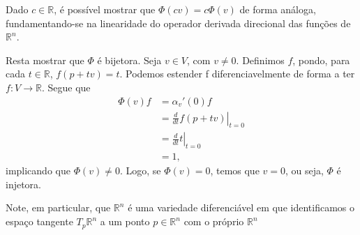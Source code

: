 \begin{lemma}
    Dado $c \in \mathbb{R}$, é possível mostrar que $\Phi(cv)=c\Phi(v)$ de forma análoga, fundamentando-se na linearidade do operador derivada direcional das funções de $\mathbb{R}^{n}$.

    Resta mostrar que $\Phi$ é bijetora. Seja $v \in V$, com $v\neq0$. Definimos $f$, pondo, para cada $t \in \mathbb{R}$, $f(p+tv)=t$. Podemos estender f diferenciavelmente de forma a ter $f:V\to \mathbb{R}$.
    Segue que
    \begin{align*}
        \Phi(v)f & =\alpha_{v}'(0)f                        \\
                 & =\left.\frac{d}{dt}f(p+tv)\right|_{t=0} \\
                 & =\left.\frac{d}{dt}t\right|_{t=0}       \\
                 & =1,
    \end{align*}
    implicando que $\Phi(v)\neq0$.
    Logo, se $\Phi(v)=0$, temos que $v=0$, ou seja, $\Phi$ é injetora.
\end{lemma}
Note, em particular, que $\mathbb{R}^{n}$ é uma variedade diferenciável em que identificamos o espaço tangente $T_{p}\mathbb{R}^{n}$ a um ponto $p \in \mathbb{R}^{n}$ com o próprio $\mathbb{R}^{n}$
